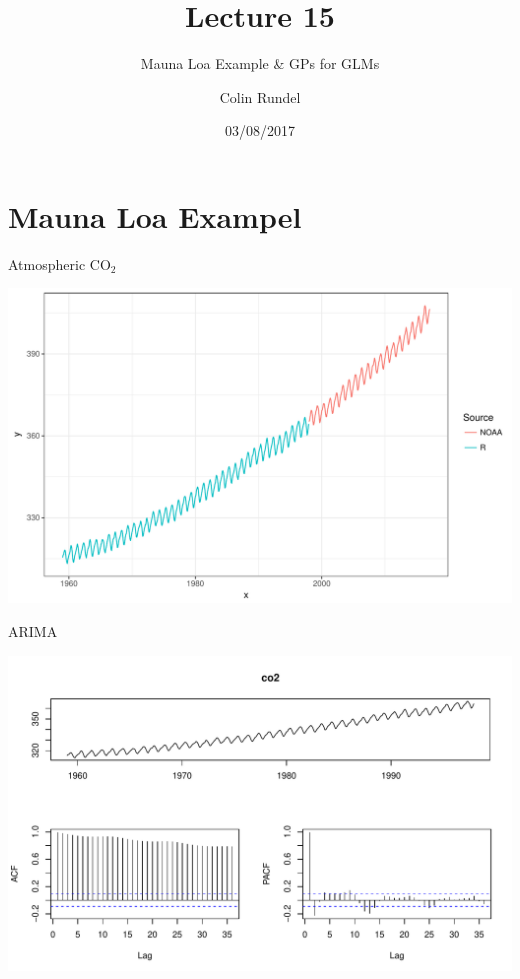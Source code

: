 \documentclass[11pt,ignorenonframetext,]{beamer}
\title{Lecture 15}
\subtitle{Mauna Loa Example \& GPs for GLMs}
\author{Colin Rundel}
\date{03/08/2017}
\begin{document}
\frame{\titlepage}

\section{Mauna Loa Exampel}\label{mauna-loa-exampel}

\begin{frame}{Atmospheric CO\(_2\)}

\includegraphics{Lec15_files/figure-beamer/unnamed-chunk-1-1.pdf}

\end{frame}

\begin{frame}{ARIMA}

\includegraphics{Lec15_files/figure-beamer/unnamed-chunk-2-1.pdf}

\end{frame}
\end{document}
